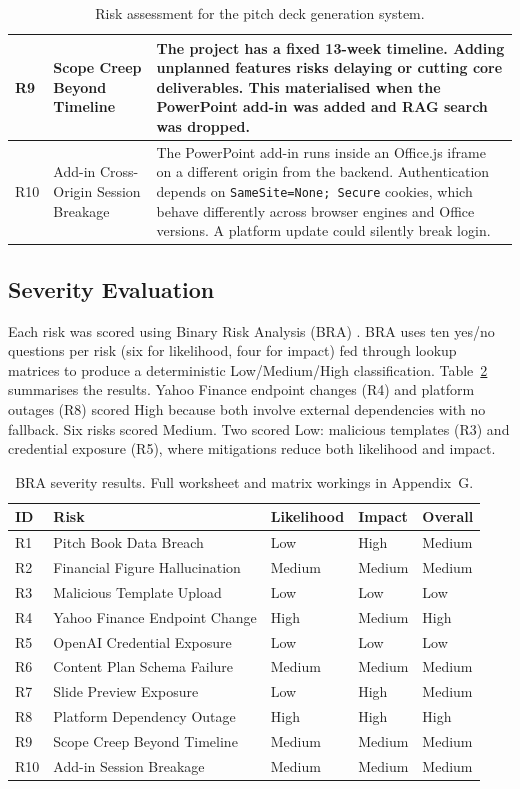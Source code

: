 \begin{table}[H]
\begin{tabular}{|l|p{3.2cm}|p{8.5cm}|}
\hline
R9 & Scope Creep Beyond Timeline & The project has a fixed 13-week timeline. Adding unplanned features risks delaying or cutting core deliverables. This materialised when the PowerPoint add-in was added and RAG search was dropped. \\
\hline
R10 & Add-in Cross-Origin Session Breakage & The PowerPoint add-in runs inside an Office.js iframe on a different origin from the backend. Authentication depends on \texttt{SameSite=None; Secure} cookies, which behave differently across browser engines and Office versions. A platform update could silently break login. \\
\hline
\end{tabular}
\caption{Risk assessment for the pitch deck generation system.}
\label{tab:risks}
\end{table}

\subsection{Severity Evaluation}

Each risk was scored using Binary Risk Analysis (BRA) \parencite{sapiro2011}. BRA uses ten yes/no questions per risk (six for likelihood, four for impact) fed through lookup matrices to produce a deterministic Low/Medium/High classification. Table~\ref{tab:bra-summary} summarises the results. Yahoo Finance endpoint changes (R4) and platform outages (R8) scored High because both involve external dependencies with no fallback. Six risks scored Medium. Two scored Low: malicious templates (R3) and credential exposure (R5), where mitigations reduce both likelihood and impact.

\begin{table}[H]
\centering
\begin{tabular}{|l|l|l|l|l|}
\hline
\rowcolor{gray!20} \textbf{ID} & \textbf{Risk} & \textbf{Likelihood} & \textbf{Impact} & \textbf{Overall} \\
\hline
R1 & Pitch Book Data Breach & Low & High & Medium \\
\hline
R2 & Financial Figure Hallucination & Medium & Medium & Medium \\
\hline
R3 & Malicious Template Upload & Low & Low & Low \\
\hline
R4 & Yahoo Finance Endpoint Change & High & Medium & High \\
\hline
R5 & OpenAI Credential Exposure & Low & Low & Low \\
\hline
R6 & Content Plan Schema Failure & Medium & Medium & Medium \\
\hline
R7 & Slide Preview Exposure & Low & High & Medium \\
\hline
R8 & Platform Dependency Outage & High & High & High \\
\hline
R9 & Scope Creep Beyond Timeline & Medium & Medium & Medium \\
\hline
R10 & Add-in Session Breakage & Medium & Medium & Medium \\
\hline
\end{tabular}
\caption{BRA severity results. Full worksheet and matrix workings in Appendix~G.}
\label{tab:bra-summary}
\end{table}

